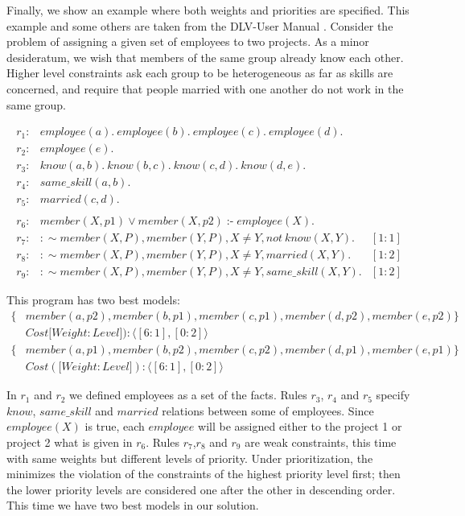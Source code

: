 \documentclass[a4paper, titlepage]{article}
\DeclareMathOperator{\leftimpl}{:-}
\begin{document}
Finally, we show an example where both weights and 
priorities are specified. This example and some others are 
taken from the DLV-User Manual \cite{brfwilvpg2009}. Consider the 
problem of assigning a given set of employees to two 
projects. As a minor desideratum, we wish that members of 
the same group already know each other. Higher level 
constraints ask each group to be heterogeneous as far as 
skills are concerned, and require that people married with 
one another do not work in the same group.
\begin{exmp}
\begin{align*}
r_1\colon& \mathit{employee}(a). \ \mathit{employee}(b). \ 
\mathit{employee}(c). \ \mathit{employee(d)}. \ \\
r_2\colon& \mathit{employee}(e). \\
r_3\colon& \mathit{know}(a,b). \ \mathit{know}(b,c). \ 
\mathit{know}(c,d). \ \mathit{know}(d,e). \ \\
r_4\colon& \mathit{same\_skill}(a,b). \\
r_5\colon& \mathit{married(c,d)}. \\
\\ 
r_6\colon& \mathit{member}(X,p1) \vee \mathit{member}(X,p2) 
\leftimpl \mathit{employee}(X).\\
r_7\colon& : \sim \mathit{member}(X,P), \mathit{member}
(Y,P), X \neq Y, \mathit{not} \ \mathit{know(X,Y)}.& 
[1:1] \\
r_{8}\colon& : \sim  \mathit{member}(X,P), \mathit{member}
(Y,P), X \neq Y, \mathit{marrie}d(X,Y). & [1:2]\\
r_{9}\colon& : \sim member(X,P), member(Y,P), X \neq Y, 
same\_skill(X,Y). & [1:2] 
\end{align*}
\end{exmp}
This program has two best models:
\begin{align*}
\{ & \mathit{member}(a,p2), \mathit{member}(b,p1), 
   \mathit{member}(c,p1), \mathit{member}(d,p2), 
   \mathit{member}(e,p2) \} \\
   & \mathit{Cost} [ \mathit{Weight:Level]}):  \langle 
   [6:1],[0:2] \rangle \\ 
\{ & \mathit{member}(a,p1), \mathit{member}(b,p2), 
   \mathit{member}(c,p2), \mathit{member}(d,p1), 
   \mathit{member}(e,p1) \} \\
   & \mathit{Cost} ([ \mathit{Weight:Level]}):\langle 
   [6:1],[0:2] \rangle
\end{align*}



In $r_1$ and $r_2$ we defined employees as a set of the 
facts. Rules $r_3$, $r_4$ and $r_5$ specify $\mathit{know}$, 
$\mathit{same\_skill}$ and $\mathit{married}$ relations 
between some of employees. Since $\mathit{employee}(X)$ is 
true, each $\mathit{employee}$ will be assigned either to 
the project 1 or project 2 what is given in $r_6$. Rules $r_{7}$,$r_{8}$ and $r_{9}$ 
are weak constraints, this time with 
same weights but different levels of priority. Under 
prioritization, the \dlvhex{} minimizes the violation of 
the constraints of the highest priority level first; then 
the lower priority levels are considered one after the 
other in descending order. This time we have two best 
models in our solution.     
\end{document}
